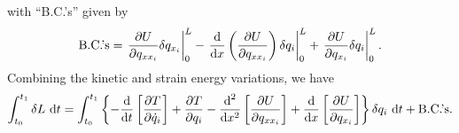 with ``B.C.'s'' given by
\begin{equation}
\text{B.C.'s} = \left.\frac{\partial U}{\partial q_{xx_i}}\delta q_{x_i}\right|_0^L-\left.\frac{\text d}{\text dx}\left(\frac{\partial U}{\partial q_{xx_i}}\right)\delta q_i\right|_0^L + \left.\frac{\partial U}{\partial q_{x_i}}\delta q_i\right|_0^L.
\end{equation} 
Combining the kinetic and strain energy variations, we have
\begin{equation}
\int_{t_0}^{t_1}\delta L\text{ d}t = \int_{t_0}^{t_1}\left\lbrace-\frac{\text d}{\text dt}\left[\frac{\partial T}{\partial \dot q_i}\right]+\frac{\partial T}{\partial q_i} - \frac{\text d^2}{\text dx^2}\left[\frac{\partial U}{\partial q_{xx_i}}\right]+\frac{\text d}{\text dx}\left[\frac{\partial  U}{\partial q_{x_i}}\right]\right\rbrace\delta q_i\text{ d}t+\text{B.C.'s}.
\end{equation}

\begin{comment}


We now consider the special case of $\delta u$. In this case, we have
\begin{equation}
\int_{t_0}^{t_1}\delta L\text{ d}t = \int_{t_0}^{t_1}\left\lbrace-\frac{\text d}{\text dt}\left[\frac{\partial T}{\partial \dot u}\right]+\frac{\partial T}{\partial u} - \frac{\text d^2}{\text dx^2}\left[\frac{\partial U}{\partial u_{xx}}\right]+\frac{\text d}{\text dx}\left[\frac{\partial  U}{\partial u_x}\right]\right\rbrace\delta u\text{ d}t+\text{B.C.'s}.
\end{equation}

Considering the special circumstances involving $\delta u$, we shall now express this result for the $u$ direction by substituting in $\delta u$ from Eqn.~\ref{eq:variation.u.final}, and expressing the variation in terms of $s$.

We have
\begin{eqnarray}
\int_{t_0}^{t_1}\delta L\text{ d}t &=&
\int_{t_0}^{t_1}\left\lbrace -\frac{\text d}{\text dt}\left[\frac{\partial T}{\partial \dot s}\right]+\frac{\partial T}{\partial s} - \frac{\text d^2}{\text dx^2}\left[\frac{\partial U}{\partial s_{xx}}\right]+\frac{\text d}{\text dx}\left[\frac{\partial  U}{\partial s_x}\right]\right\rbrace {\vrule width 0in depth .1in} \\
& &\qquad \cdot\left[\delta s + \int_0^x\frac{\partial^2 v}{\partial \eta^2}\delta v\text{ d}\eta + \int_0^x\frac{\partial^2 w}{\partial \eta^2}\delta w\text{ d}\eta\right]\text{ d}t+ \text{B.C.'s}. \nonumber
\end{eqnarray}
\end{comment}


